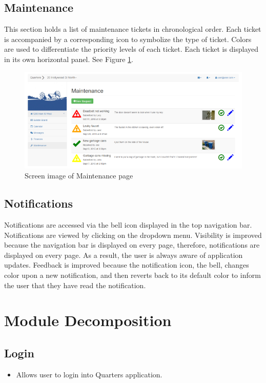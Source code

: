 \documentclass[12pt]{article}
\begin{document}
\subsection{Maintenance}
This section holds a list of maintenance tickets in chronological order. Each ticket is accompanied by a corresponding icon to symbolize the type of ticket. Colors are used to differentiate the priority levels of each ticket. Each ticket is displayed in its own horizontal panel. See Figure \ref{fig:maintenance}.

\begin{figure}
\centering
\includegraphics[width=\textwidth]{maintenance}
\caption{Screen image of Maintenance page}
\label{fig:maintenance}
\end{figure}

\subsection{Notifications}
Notifications are accessed via the bell icon displayed in the top navigation bar. Notifications are viewed by clicking on the dropdown menu. Visibility is improved because the navigation bar is displayed on every page, therefore, notifications are displayed on every page. As a result, the user is always aware of application updates. Feedback is improved because the notification icon, the bell, changes color upon a new notification, and then reverts back to its default color to inform the user that they have read the notification.



\section{Module Decomposition}

\subsection{Login}
\begin{itemize}
    \item Allows user to login into Quarters application.
\end{itemize}
\end{document}
